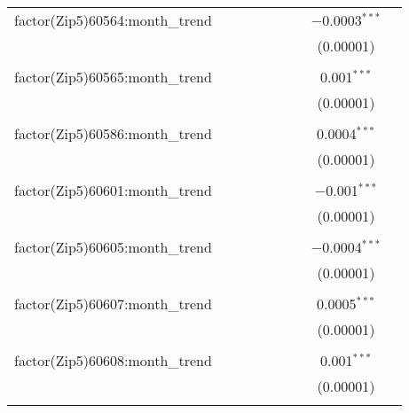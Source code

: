 \begin{table}[H]
{\begin{tabular}{@{\extracolsep{5pt}}lcccccccc}
  factor(Zip5)60564:month\_trend &  &  &  &  &  &  & $-$0.0003$^{***}$ &  \\  

   &  &  &  &  &  &  & (0.00001) &  \\  

   & & & & & & & & \\  

  factor(Zip5)60565:month\_trend &  &  &  &  &  &  & 0.001$^{***}$ &  \\  

   &  &  &  &  &  &  & (0.00001) &  \\  

   & & & & & & & & \\  

  factor(Zip5)60586:month\_trend &  &  &  &  &  &  & 0.0004$^{***}$ &  \\  

   &  &  &  &  &  &  & (0.00001) &  \\  

   & & & & & & & & \\  

  factor(Zip5)60601:month\_trend &  &  &  &  &  &  & $-$0.001$^{***}$ &  \\  

   &  &  &  &  &  &  & (0.00001) &  \\  

   & & & & & & & & \\  

  factor(Zip5)60605:month\_trend &  &  &  &  &  &  & $-$0.0004$^{***}$ &  \\  

   &  &  &  &  &  &  & (0.00001) &  \\  

   & & & & & & & & \\  

  factor(Zip5)60607:month\_trend &  &  &  &  &  &  & 0.0005$^{***}$ &  \\  

   &  &  &  &  &  &  & (0.00001) &  \\  

   & & & & & & & & \\  

  factor(Zip5)60608:month\_trend &  &  &  &  &  &  & 0.001$^{***}$ &  \\  

   &  &  &  &  &  &  & (0.00001) &  \\  

   & & & & & & & & \\  


\end{tabular}}
\end{table}
